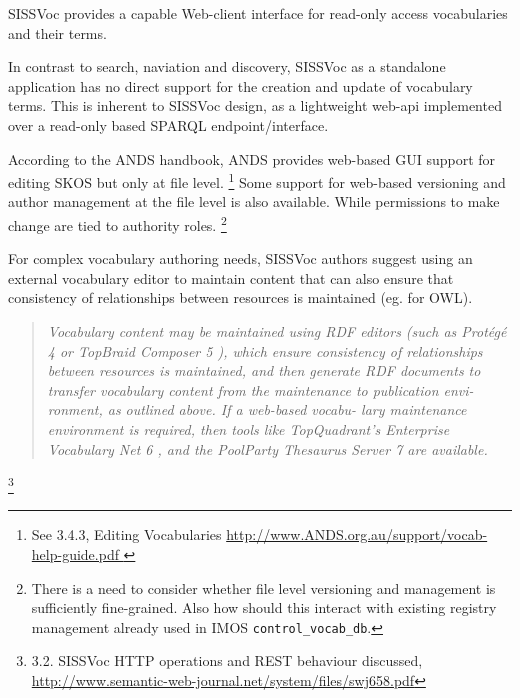 \documentclass[10pt,a4paper]{article}
\newenvironment{italicquotes}
{\begin{quote}\itshape}
{\end{quote}}
\begin{document}
\begin{flushleft}
   \item  SISSVoc provides a capable Web-client interface for read-only access
  vocabularies and their terms.

   \item  In contrast to search, naviation and discovery, SISSVoc as a standalone
  application has no direct support for the creation and update of vocabulary
  terms. This is inherent to SISSVoc design, as a lightweight web-api implemented
  over a read-only based SPARQL endpoint/interface.  

 \item    According to the ANDS handbook, ANDS provides web-based GUI support for
  editing SKOS but only at file level.  \footnote { See 3.4.3, Editing
  Vocabularies \url{ http://www.ANDS.org.au/support/vocab-help-guide.pdf } } Some 
  support for web-based versioning and author management at the file level
  is also available. While permissions to make change are tied to authority 
  roles.  \footnote { There is a need to consider whether file level versioning and
  management is sufficiently fine-grained. Also how should this interact with
  existing registry management already used in IMOS \texttt{control\_vocab\_db}.
  }
    
 \item    For complex vocabulary authoring needs, SISSVoc authors suggest using an
  external vocabulary editor to maintain content that can also ensure that
  consistency of relationships between resources is maintained (eg. for OWL). 

    \begin{italicquotes} Vocabulary content may be maintained using RDF editors
  (such as Protégé 4 or TopBraid Composer 5 ), which ensure consistency of
  relationships between resources is maintained, and then generate RDF documents
  to transfer vocabulary content from the maintenance to publication envi-
  ronment, as outlined above. If a web-based vocabu- lary maintenance environment
  is required, then tools like TopQuadrant’s Enterprise Vocabulary Net 6 , and
  the PoolParty Thesaurus Server 7 are available.  \end{italicquotes} 

    \footnote { 3.2. SISSVoc HTTP operations and REST behaviour discussed,
  \url{http://www.semantic-web-journal.net/system/files/swj658.pdf} }



\end{flushleft}
\end{document}
